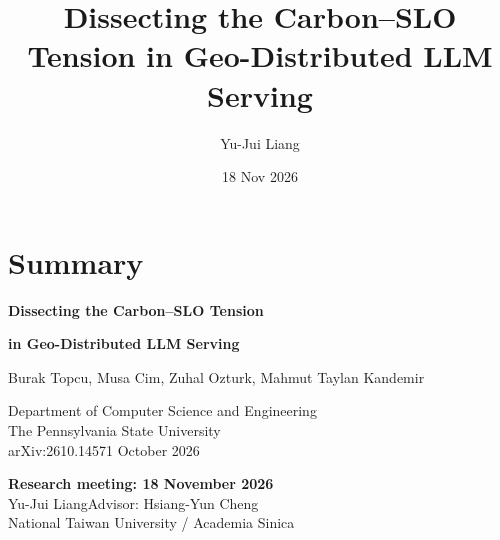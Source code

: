 \documentclass[aspectratio=169,10pt]{beamer}
\title[Carbon--SLO]{Dissecting the Carbon--SLO Tension in Geo-Distributed LLM Serving}
\author{Yu-Jui Liang}
\institute{National Taiwan University / Academia Sinica}
\date{18 Nov 2026}
\newcommand{\slideid}{}
\begin{document}
\section{Summary}

\renewcommand{\slideid}{Main 01 / 16}
\begin{frame}[c,label=M01]
\vspace*{\fill}
{\LARGE\bfseries Dissecting the Carbon--SLO Tension\par}
{\LARGE\bfseries in Geo-Distributed LLM Serving\par}
\vspace{0.65cm}
{\large Burak Topcu, Musa Cim, Zuhal Ozturk, Mahmut Taylan Kandemir\par}
\vspace{0.12cm}
{\color{Muted}Department of Computer Science and Engineering\\
The Pennsylvania State University\\
arXiv:2610.14571  October 2026}\par
\vspace{0.75cm}
\textbf{Research meeting: 18 November 2026}\\[0.12cm]
Yu-Jui Liang\quad Advisor: Hsiang-Yun Cheng\\
National Taiwan University / Academia Sinica
\par\vfill
\end{frame}
\end{document}
